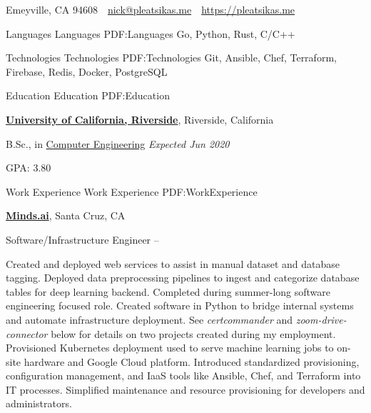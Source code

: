 \documentclass[letterpaper,MMMyyyy,nonstopmode]{simpleresumecv}
\newcommand{\CVAuthor}{Nick Pleatsikas}
\newcommand{\CVWebpage}{https://pleatsikas.me}
\begin{document}

\Title{\CVAuthor}

\begin{SubTitle}
Emeyville, CA 94608
\,\SubBulletSymbol\,
\href{mailto:nick@pleatsikas.me}
{nick@pleatsikas.me}
\,\SubBulletSymbol\,
\href{\CVWebpage}
{\url{\CVWebpage}}
\end{SubTitle}

\begin{Body}


\Section
{Languages}
{Languages}
{PDF:Languages}
Go, Python, Rust, C/C++


\Section
{Technologies}
{Technologies}
{PDF:Technologies}
Git, Ansible, Chef, Terraform, Firebase, Redis, Docker, PostgreSQL


\Section
{Education}
{Education}
{PDF:Education}

\Entry
\href{ucr.edu}
{\textbf{University of California, Riverside}},
Riverside, California

\Gap
\BulletItem
B.Sc., in
\href{https://engr.ucr.edu}
{Computer Engineering}
\hfill
\textit{Expected Jun 2020}
\begin{Detail}
\SubBulletItem
GPA: 3.80
\end{Detail}


\Section
{Work\newline
Experience}
{Work Experience}
{PDF:WorkExperience}

\Entry
\href{https://minds.ai}
{\textbf{Minds.ai}},
Santa Cruz, CA

\Gap
\BulletItem
Software/Infrastructure Engineer
\hfill
{} --
\begin{Detail}
\SubBulletItem
Created and deployed web services to assist in manual dataset and database tagging. Deployed
data preprocessing pipelines to ingest and categorize database tables for deep learning
backend. Completed during summer-long software engineering focused role.
\SubBulletItem
Created software in Python to bridge internal systems and automate infrastructure deployment.
See \textit{certcommander} and \textit{zoom-drive-connector} below for details on two
projects created during my employment.
\SubBulletItem
Provisioned Kubernetes deployment used to serve machine learning jobs to on-site hardware and Google Cloud platform.
\SubBulletItem
Introduced standardized provisioning, configuration management, and IaaS tools like Ansible, Chef, and Terraform into IT processes. Simplified maintenance and resource provisioning for
developers and administrators.
\end{Detail}
\BigGap


\end{Body}
\end{document}
